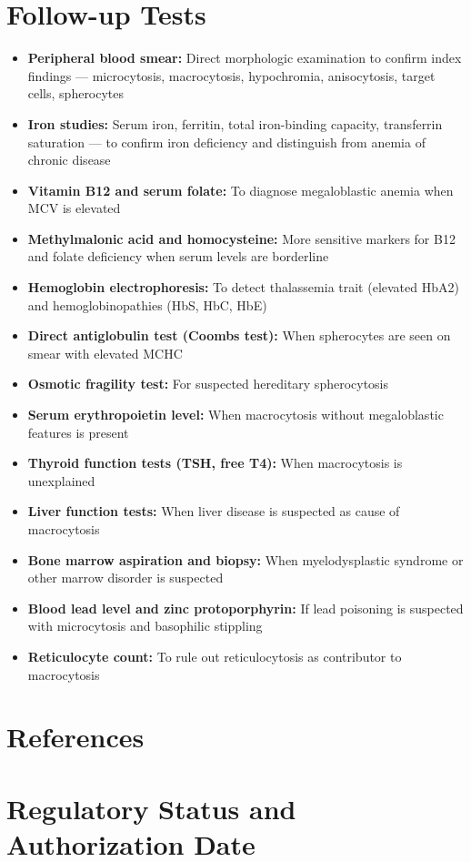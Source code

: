 \section*{Follow-up Tests}
\begin{itemize}
  \item \textbf{Peripheral blood smear:} Direct morphologic examination to confirm index findings --- microcytosis, macrocytosis, hypochromia, anisocytosis, target cells, spherocytes
  \item \textbf{Iron studies:} Serum iron, ferritin, total iron-binding capacity, transferrin saturation --- to confirm iron deficiency and distinguish from anemia of chronic disease
  \item \textbf{Vitamin B12 and serum folate:} To diagnose megaloblastic anemia when MCV is elevated
  \item \textbf{Methylmalonic acid and homocysteine:} More sensitive markers for B12 and folate deficiency when serum levels are borderline
  \item \textbf{Hemoglobin electrophoresis:} To detect thalassemia trait (elevated HbA2) and hemoglobinopathies (HbS, HbC, HbE)
  \item \textbf{Direct antiglobulin test (Coombs test):} When spherocytes are seen on smear with elevated MCHC
  \item \textbf{Osmotic fragility test:} For suspected hereditary spherocytosis
  \item \textbf{Serum erythropoietin level:} When macrocytosis without megaloblastic features is present
  \item \textbf{Thyroid function tests (TSH, free T4):} When macrocytosis is unexplained
  \item \textbf{Liver function tests:} When liver disease is suspected as cause of macrocytosis
  \item \textbf{Bone marrow aspiration and biopsy:} When myelodysplastic syndrome or other marrow disorder is suspected
  \item \textbf{Blood lead level and zinc protoporphyrin:} If lead poisoning is suspected with microcytosis and basophilic stippling
  \item \textbf{Reticulocyte count:} To rule out reticulocytosis as contributor to macrocytosis
\end{itemize}

\section*{References}



\clearpage
\section*{Regulatory Status and Authorization Date}

\clearpage
